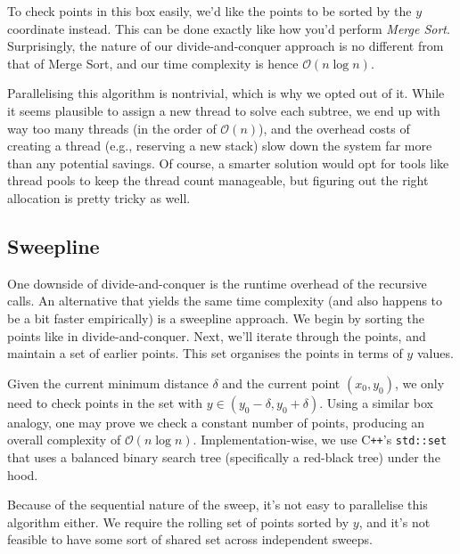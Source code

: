 To check points in this box easily, we'd like the points to be sorted by the $y$ coordinate instead.
This can be done exactly like how you'd perform \textit{Merge Sort}. Surprisingly, the nature
of our divide-and-conquer approach is no different from that of Merge Sort, and our time complexity
is hence $\mathcal{O}(n \log n)$.

\begin{aside}
    Parallelising this algorithm is nontrivial, which is why we opted out of it. While it seems plausible
    to assign a new thread to solve each subtree, we end up with way too many threads (in the order of $\mathcal{O}(n)$),
    and the overhead costs of creating a thread (e.g., reserving a new stack) slow down the system far more
    than any potential savings. Of course, a smarter solution would opt for tools like
    thread pools to keep the thread count manageable, but figuring out the right allocation is pretty tricky as well.
\end{aside}

\subsection{Sweepline}

One downside of divide-and-conquer is the runtime overhead of the recursive calls. An alternative
that yields the same time complexity (and also happens to be a bit faster empirically) is
a sweepline approach. We begin by sorting the points like in divide-and-conquer. Next, we'll
iterate through the points, and maintain a set of earlier points. This set organises the points
in terms of $y$ values.

Given the current minimum distance $\delta$ and the current
point $(x_{0}, y_{0})$, we only need to check points in the set with $y \in (y_{0} - \delta, y_{0} + \delta)$.
Using a similar box analogy, one may prove we check a constant number of points, producing an
overall complexity of $\mathcal{O}(n \log n)$. Implementation-wise, we use C\texttt{++}'s
\texttt{std::set} that uses a balanced binary search tree (specifically a red-black tree) under the hood.

\begin{aside}
    Because of the sequential nature of the sweep, it's not easy to parallelise this algorithm
    either. We require the rolling set of points sorted by $y$, and it's not feasible to have
    some sort of shared set across independent sweeps.
\end{aside}

